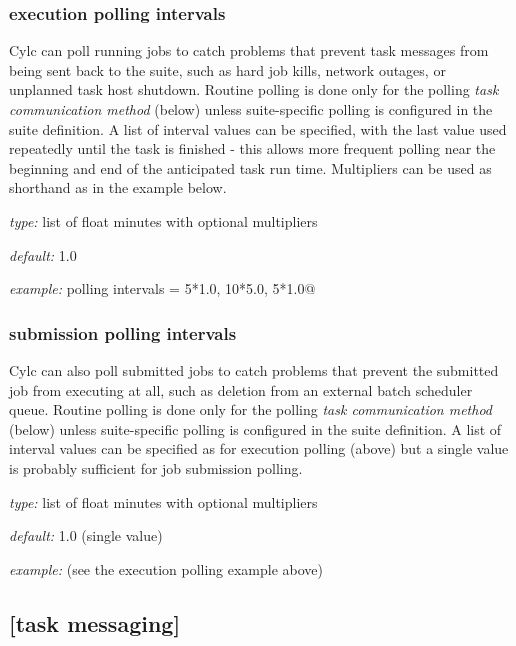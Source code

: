 \subsubsection{execution polling intervals}

Cylc can poll running jobs to catch problems that prevent task messages
from being sent back to the suite, such as hard job kills, network
outages, or unplanned task host shutdown. Routine polling is done only 
for the polling {\em task communication method} (below) unless 
suite-specific polling is configured in the suite definition.
A list of interval values can be specified, with the last value used
repeatedly until the task is finished - this allows more frequent
polling near the beginning and end of the anticipated task run time.
Multipliers can be used as shorthand as in the example below.

\begin{myitemize}
\item {\em type:} list of float minutes with optional multipliers
\item {\em default:} 1.0
\item {\em example:} \lstinline@execution polling intervals = 5*1.0, 10*5.0, 5*1.0@
\end{myitemize}


\subsubsection{submission polling intervals}

Cylc can also poll submitted jobs to catch problems that prevent the
submitted job from executing at all, such as deletion from an external 
batch scheduler queue. Routine polling is done only for the polling {\em
task communication method} (below) unless suite-specific polling
is configured in the suite definition. A list of interval
values can be specified as for execution polling (above) but a single
value is probably sufficient for job submission polling. 

\begin{myitemize}
\item {\em type:} list of float minutes with optional multipliers
\item {\em default:} 1.0 (single value)
\item {\em example:} (see the execution polling example above)
\end{myitemize}

\subsection{[task messaging]}

